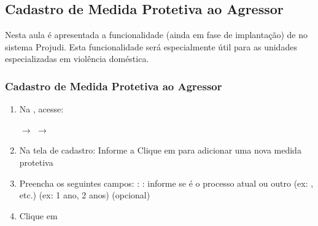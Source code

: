 \documentclass[letterpaper,10pt,brazil]{sphinxmanual}
\begin{document}
\subsection{Cadastro de Medida Protetiva ao Agressor}
\label{\detokenize{projud_57_medidaprotetivaagressor:cadastro-de-medida-protetiva-ao-agressor}}\label{\detokenize{projud_57_medidaprotetivaagressor::doc}}
\sphinxAtStartPar
Nesta aula é apresentada a funcionalidade (ainda em fase de implantação) de  no sistema Projudi. Esta funcionalidade será especialmente útil para as unidades especializadas em violência doméstica.


\subsubsection{Cadastro de Medida Protetiva ao Agressor}
\label{\detokenize{projud_57_medidaprotetivaagressor:id1}}\begin{enumerate}
%
\item {} 
\sphinxAtStartPar
Na , acesse:

\sphinxAtStartPar
{} \(\rightarrow\)  \(\rightarrow\) 

\item {} 
\sphinxAtStartPar
Na tela de cadastro:
\sphinxhyphen{} Informe a 
\sphinxhyphen{} Clique em  para adicionar uma nova medida protetiva

\item {} 
\sphinxAtStartPar
Preencha os seguintes campos:
\sphinxhyphen{} : 
\sphinxhyphen{} : informe se é o processo atual ou outro
\sphinxhyphen{}  (ex: ,  etc.)
\sphinxhyphen{}  (ex: 1 ano, 2 anos)
\sphinxhyphen{} 
\sphinxhyphen{}  (opcional)

\item {} 
\sphinxAtStartPar
Clique em 

\end{enumerate}
\end{document}
